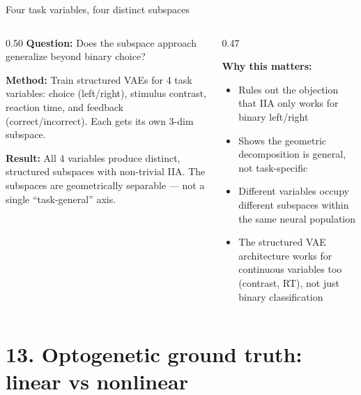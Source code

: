 \documentclass[aspectratio=169,11pt]{beamer}
\begin{document}
\begin{frame}{Four task variables, four distinct subspaces}
\begin{columns}[T]
\begin{column}{0.50\textwidth}
\textbf{Question:} Does the subspace approach generalize beyond binary choice?

\vspace{0.5em}
\textbf{Method:} Train structured VAEs for 4 task variables: choice (left/right), stimulus contrast, reaction time, and feedback (correct/incorrect). Each gets its own 3-dim subspace.

\vspace{0.5em}
\textbf{Result:} All 4 variables produce distinct, structured subspaces with non-trivial IIA. The subspaces are geometrically separable --- not a single ``task-general'' axis.
\end{column}

\begin{column}{0.47\textwidth}
\vspace{0.5em}
{\small
\textbf{Why this matters:}
\begin{itemize}\setlength\itemsep{0.3em}
  \item Rules out the objection that IIA only works for binary left/right
  \item Shows the geometric decomposition is general, not task-specific
  \item Different variables occupy different subspaces within the same neural population
  \item The structured VAE architecture works for continuous variables too (contrast, RT), not just binary classification
\end{itemize}
}
\end{column}
\end{columns}
\end{frame}

\section{13. Optogenetic ground truth: linear vs nonlinear}
\end{document}
